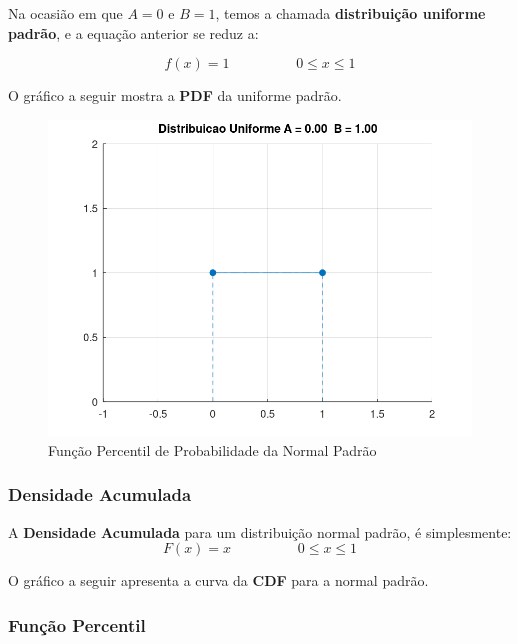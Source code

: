 \documentclass[
]{book}
\begin{document}
Na ocasião em que \(A = 0\) e \(B = 1\), temos a chamada \textbf{distribuição uniforme padrão}, e a equação anterior se reduz a:

\begin{equation}
f(x) = 1 \hspace{2cm} 0 \leq x \leq 1
\end{equation}

O gráfico a seguir mostra a \textbf{PDF} da uniforme padrão.

\begin{figure}

{\centering \includegraphics[width=0.5\linewidth]{images/uniformepadraopdf} 

}

\caption{Função Percentil de Probabilidade da Normal Padrão}\label{fig:unnamed-chunk-5}
\end{figure}

\hypertarget{densidade-acumulada-1}{%
\subsubsection*{Densidade Acumulada}\label{densidade-acumulada-1}}

A \textbf{Densidade Acumulada} para um distribuição normal padrão, é simplesmente:
\begin{equation}
  F(x) = x \hspace{2cm} 0 \leq x \leq 1
\end{equation}

O gráfico a seguir apresenta a curva da \textbf{CDF} para a normal padrão.

\hypertarget{funuxe7uxe3o-percentil-1}{%
\subsubsection*{Função Percentil}\label{funuxe7uxe3o-percentil-1}}
\end{document}
